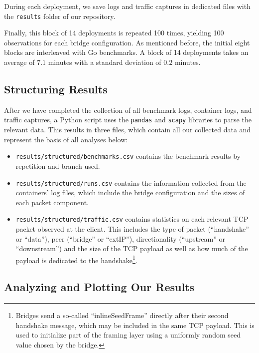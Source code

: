 During each deployment, we save logs and traffic captures in dedicated files with the \texttt{results} folder of our repository.

Finally, this block of 14 deployments is repeated 100 times, yielding 100 observations for each bridge configuration. As mentioned before, the initial eight blocks are interleaved with Go benchmarks.
A block of 14 deployments takes an average of $7.1$ minutes with a standard deviation of $0.2$ minutes.

\subsection{Structuring Results}

After we have completed the collection of all benchmark logs, container logs, and traffic captures, a Python script uses the \texttt{pandas} and \texttt{scapy} libraries to parse the relevant data. This results in three files, which contain all our collected data and represent the basis of all analyses below:
\begin{itemize}
    \item \texttt{results/structured/benchmarks.csv} contains the benchmark results by repetition and branch used.
    \item \texttt{results/structured/runs.csv} contains the information collected from the containers' log files, which include the bridge configuration and the sizes of each packet component.
    \item \texttt{results/structured/traffic.csv} contains statistics on each relevant TCP packet observed at the client. This includes the type of packet (``handshake'' or ``data''), peer (``bridge'' or ``extIP''), directionality (``upstream'' or ``downstream'') and the size of the TCP payload as well as how much of the payload is dedicated to the handshake\footnote{Bridges send a so-called ``inlineSeedFrame'' directly after their second handshake message, which may be included in the same TCP payload. This is used to initialize part of the framing layer using a uniformly random seed value chosen by the bridge.}.
\end{itemize}

\subsection{Analyzing and Plotting Our Results}

